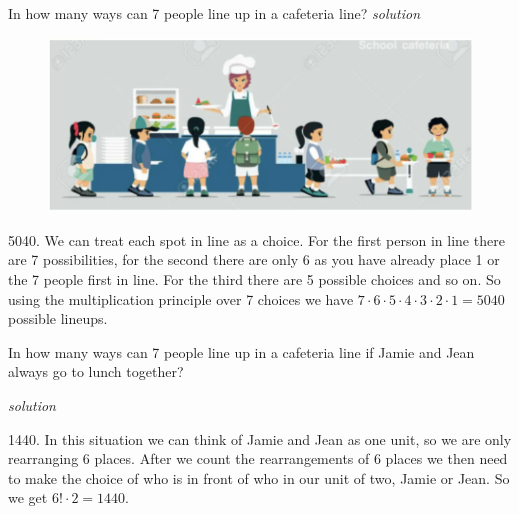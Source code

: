 \documentclass{amsbook}
\begin{document}
\begin{Exercise}[title={Rearrangements}, difficulty=0, label=m3]
    In how many ways can 7 people line up in a cafeteria line? \hfill \emph{solution} 
    
    \begin{figure}[H]
        \includegraphics[width=.5\linewidth]{j.png}
    \end{figure}
\end{Exercise}

\begin{Answer}[ref={m3}]
    5040. We can treat each spot in line as a choice. For the first person in line there are 7 possibilities, for the second there are only 6 as you have already place 1 or the 7 people first in line. For the third there are 5 possible choices and so on. So using the multiplication principle over 7 choices we have $7\cdot 6\cdot 5\cdot 4\cdot 3\cdot 2\cdot 1=5040$ possible lineups.
\end{Answer}

\begin{Exercise}[title={Rearrangements with a restriction}, difficulty=1, label=m4]
    In how many ways can 7 people line up in a cafeteria line if Jamie and Jean always go to lunch together?

    \hfill \emph{solution} 
\end{Exercise}

\begin{Answer}[ref={m4}]
    1440. In this situation we can think of Jamie and Jean as one unit, so we are only rearranging 6 places. After we count the rearrangements of 6 places we then need to make the choice of who is in front of who in our unit of two, Jamie or Jean. So we get $6! \cdot 2=1440$.
\end{Answer}
\end{document}
